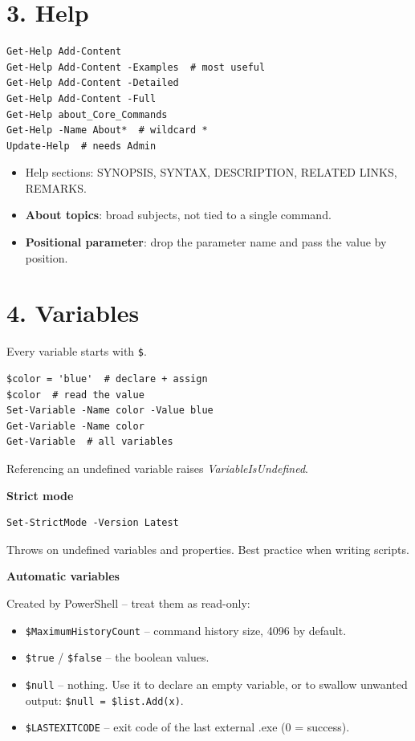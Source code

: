 \section{3. Help}
\begin{verbatim}
Get-Help Add-Content
Get-Help Add-Content -Examples  # most useful
Get-Help Add-Content -Detailed
Get-Help Add-Content -Full
Get-Help about_Core_Commands
Get-Help -Name About*  # wildcard *
Update-Help  # needs Admin
\end{verbatim}
\begin{itemize}
\item Help sections: SYNOPSIS, SYNTAX, DESCRIPTION, RELATED LINKS, REMARKS.
\item \textbf{About topics}: broad subjects, not tied to a single command.
\item \textbf{Positional parameter}: drop the parameter name and pass the value by position.
\end{itemize}

\section{4. Variables}
Every variable starts with \texttt{\$}.
\begin{verbatim}
$color = 'blue'  # declare + assign
$color  # read the value
Set-Variable -Name color -Value blue
Get-Variable -Name color
Get-Variable  # all variables
\end{verbatim}
Referencing an undefined variable raises \emph{VariableIsUndefined}.

\textbf{Strict mode}

\begin{verbatim}
Set-StrictMode -Version Latest
\end{verbatim}
Throws on undefined variables and properties. Best practice when writing scripts.

\textbf{Automatic variables}

Created by PowerShell -- treat them as read-only:
\begin{itemize}
\item \texttt{\$MaximumHistoryCount} -- command history size, 4096 by default.
\item \texttt{\$true} / \texttt{\$false} -- the boolean values.
\item \texttt{\$null} -- nothing. Use it to declare an empty variable, or to swallow unwanted output: \texttt{\$null = \$list.Add(x)}.
\item \texttt{\$LASTEXITCODE} -- exit code of the last external .exe (0 = success).
\end{itemize}

